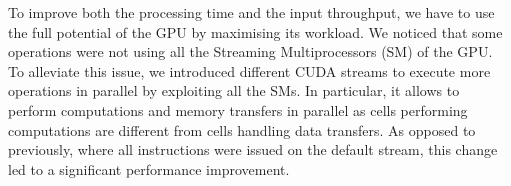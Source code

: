 To improve both the processing time and the input throughput, we have to use the full potential of the GPU by maximising its workload. We noticed that some operations were not using all the Streaming Multiprocessors (SM) of the GPU. To alleviate this issue, we introduced different CUDA streams to execute more operations in parallel by exploiting all the SMs. In particular, it allows to perform computations and memory transfers in parallel as cells performing computations are different from cells handling data transfers. As opposed to previously, where all instructions were issued on the default stream, this change led to a significant performance improvement.